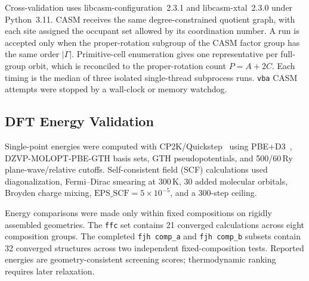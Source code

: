 \documentclass[pdflatex,sn-mathphys-num]{sn-jnl}
\theoremstyle{thmstyleone}%
\begin{document}
Cross-validation uses \textsf{libcasm-configuration}~2.3.1 and \textsf{libcasm-xtal}~2.3.0 under Python~3.11. CASM receives the same degree-constrained quotient graph, with each site assigned the occupant set allowed by its coordination number. A run is accepted only when the proper-rotation subgroup of the CASM factor group has the same order $|\Gamma|$. Primitive-cell enumeration gives one representative per full-group orbit, which is reconciled to the proper-rotation count $P=A+2C$. Each timing is the median of three isolated single-thread subprocess runs. \texttt{vba} CASM attempts were stopped by a wall-clock or memory watchdog.

\subsection*{DFT Energy Validation}
Single-point energies were computed with CP2K/Quickstep~\cite{cp2k2020} using PBE+D3~\cite{perdew1996pbe,grimme2010d3}, DZVP-MOLOPT-PBE-GTH basis sets, GTH pseudopotentials, and 500/60\,Ry plane-wave/relative cutoffs. Self-consistent field (SCF) calculations used diagonalization, Fermi--Dirac smearing at 300\,K, 30 added molecular orbitals, Broyden charge mixing, $\mathrm{EPS\_SCF}=5\times10^{-5}$, and a 300-step ceiling.

Energy comparisons were made only within fixed compositions on rigidly assembled geometries. The \texttt{ffc} set contains 21 converged calculations across eight composition groups. The completed \texttt{fjh comp\_a} and \texttt{fjh comp\_b} subsets contain 32 converged structures across two independent fixed-composition tests. Reported energies are geometry-consistent screening scores; thermodynamic ranking requires later relaxation.
\end{document}
